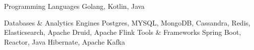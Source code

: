 

\begin{cvskills}

  \cvskill
    {Programming Languages} %
    {Golang, Kotlin, Java} %

  \cvskill
    {Databases \& Analytics Engines} %
    {Postgres, MYSQL, MongoDB, Cassandra, Redis, Elasticsearch, Apache Druid, Apache Flink} %
  \cvskill
    {Tools \& Frameworks} %
    {Spring Boot, Reactor, Java Hibernate, Apache Kafka} %

\end{cvskills}
